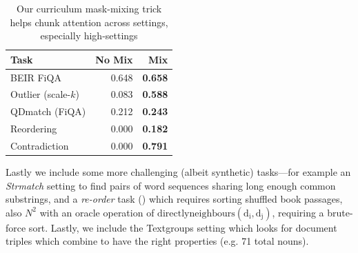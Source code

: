 \begin{table}
\centering
\small
\setlength{\tabcolsep}{5pt}
\begin{tabular}{lrr}
\toprule
Task & No Mix & Mix \\
\midrule
BEIR FiQA & 0.648 & \textbf{0.658} \\
Outlier (scale-$k$) & 0.083 & \textbf{0.588} \\
QDmatch (FiQA) & 0.212 & \textbf{0.243} \\
Reordering & 0.000 & \textbf{0.182} \\
Contradiction & 0.000 & \textbf{0.791} \\
\bottomrule
\end{tabular}
\caption{Our curriculum mask-mixing trick helps chunk attention across settings, especially high-\cname settings}
\label{tab:maskmix}
\end{table}

Lastly we include some more challenging (albeit synthetic) tasks---for example an  \emph{Strmatch} setting to find pairs of word sequences sharing long enough common substrings, and a \emph{re-order} task (\cite{Bai2024LongBenchVT}) which requires sorting shuffled book passages, also $N^2$ with an oracle operation of $\mathrm{directlyneighbours(d_i, d_j)}$, requiring a brute-force sort. Lastly, we include the  Textgroups setting which looks for document triples which combine to have the right properties (e.g. 71 total nouns). 


